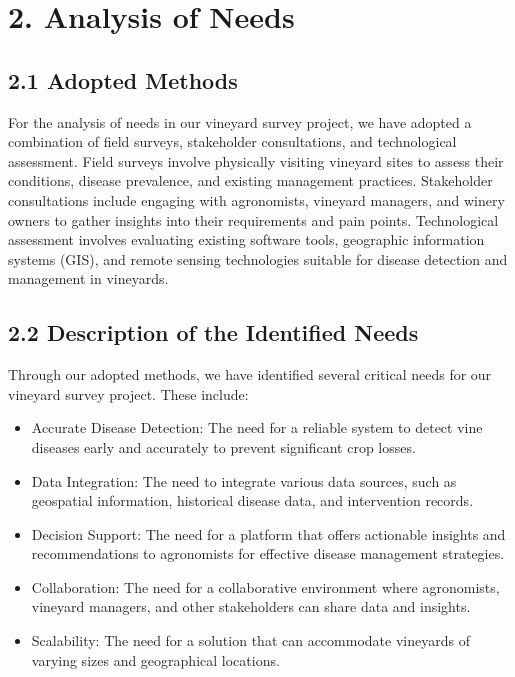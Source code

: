 \section{2. Analysis of Needs}

\subsection{2.1 Adopted Methods}
For the analysis of needs in our vineyard survey project, we have adopted a combination of field surveys, stakeholder consultations, and technological assessment. Field surveys involve physically visiting vineyard sites to assess their conditions, disease prevalence, and existing management practices. Stakeholder consultations include engaging with agronomists, vineyard managers, and winery owners to gather insights into their requirements and pain points. Technological assessment involves evaluating existing software tools, geographic information systems (GIS), and remote sensing technologies suitable for disease detection and management in vineyards.

\subsection{2.2 Description of the Identified Needs}
Through our adopted methods, we have identified several critical needs for our vineyard survey project. These include:
\begin{itemize}
    \item Accurate Disease Detection: The need for a reliable system to detect vine diseases early and accurately to prevent significant crop losses.
    \item Data Integration: The need to integrate various data sources, such as geospatial information, historical disease data, and intervention records.
    \item Decision Support: The need for a platform that offers actionable insights and recommendations to agronomists for effective disease management strategies.
    \item Collaboration: The need for a collaborative environment where agronomists, vineyard managers, and other stakeholders can share data and insights.
    \item Scalability: The need for a solution that can accommodate vineyards of varying sizes and geographical locations.
\end{itemize}

